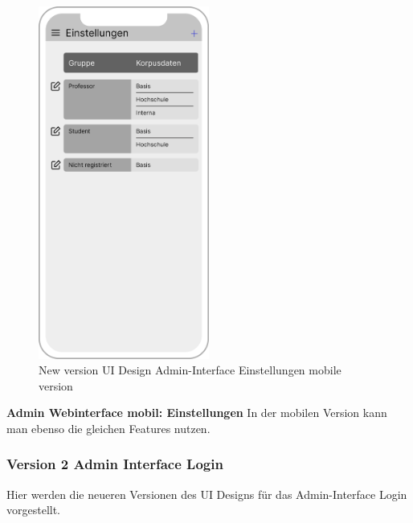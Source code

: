 \begin{figure}[H]
    \centering
    \includegraphics[width=0.5\textwidth]{bilder/new vers. UI Design/Einstellungen/iPhone X Einstellungen I (1).png}
    \caption{New version UI Design Admin-Interface Einstellungen mobile version}
    \label{fig:New version UI Design Admin-Interface Einstellungen mobile version}
\end{figure}
\noindent \textbf{Admin Webinterface mobil: Einstellungen} \newline
In der mobilen Version kann man ebenso die gleichen Features nutzen.

\subsubsection{Version 2 Admin Interface Login}
Hier werden die neueren Versionen des UI Designs für das Admin-Interface Login vorgestellt.

